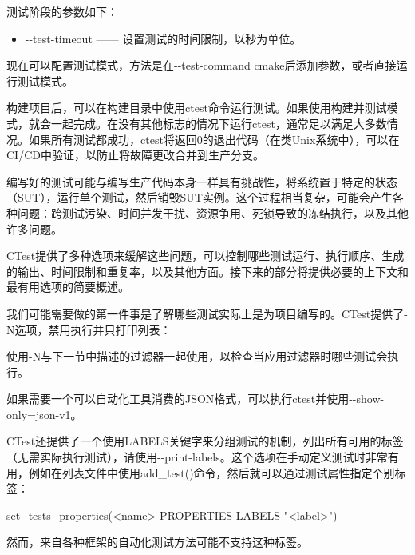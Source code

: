 测试阶段的参数如下：

\begin{itemize}
\item
-{}-test-timeout —— 设置测试的时间限制，以秒为单位。
\end{itemize}

现在可以配置测试模式，方法是在-{}-test-command cmake后添加参数，或者直接运行测试模式。


构建项目后，可以在构建目录中使用ctest命令运行测试。如果使用构建并测试模式，就会一起完成。在没有其他标志的情况下运行ctest，通常足以满足大多数情况。如果所有测试都成功，ctest将返回0的退出代码（在类Unix系统中），可以在CI/CD中验证，以防止将故障更改合并到生产分支。

编写好的测试可能与编写生产代码本身一样具有挑战性，将系统置于特定的状态（SUT），运行单个测试，然后销毁SUT实例。这个过程相当复杂，可能会产生各种问题：跨测试污染、时间并发干扰、资源争用、死锁导致的冻结执行，以及其他许多问题。

CTest提供了多种选项来缓解这些问题，可以控制哪些测试运行、执行顺序、生成的输出、时间限制和重复率，以及其他方面。接下来的部分将提供必要的上下文和最有用选项的简要概述。


我们可能需要做的第一件事是了解哪些测试实际上是为项目编写的。CTest提供了-N选项，禁用执行并只打印列表：


使用-N与下一节中描述的过滤器一起使用，以检查当应用过滤器时哪些测试会执行。

如果需要一个可以自动化工具消费的JSON格式，可以执行ctest并使用-{}-show-only=json-v1。

CTest还提供了一个使用LABELS关键字来分组测试的机制，列出所有可用的标签（无需实际执行测试），请使用-{}-print-labels。这个选项在手动定义测试时非常有用，例如在列表文件中使用add\_test()命令，然后就可以通过测试属性指定个别标签：

\begin{cmake}
set_tests_properties(<name> PROPERTIES LABELS "<label>")
\end{cmake}

然而，来自各种框架的自动化测试方法可能不支持这种标签。


